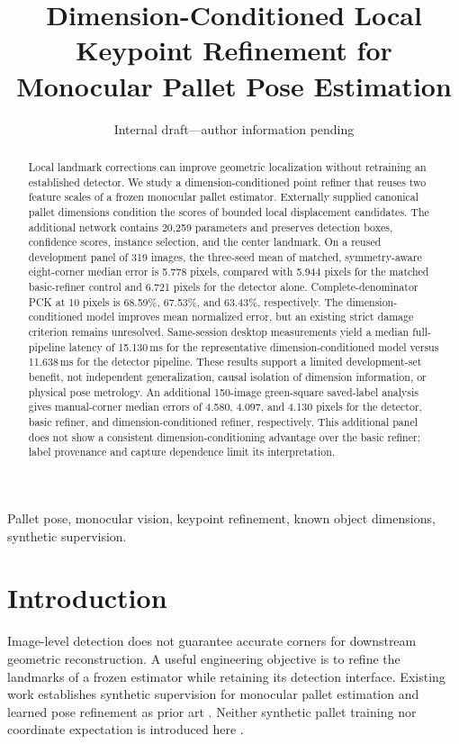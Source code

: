 \documentclass[journal]{IEEEtran}
\title{Dimension-Conditioned Local Keypoint Refinement for Monocular Pallet Pose Estimation}
\author{Internal draft---author information pending}
\begin{document}
\maketitle
\begin{abstract}
Local landmark corrections can improve geometric localization without retraining an established detector. We study a dimension-conditioned point refiner that reuses two feature scales of a frozen monocular pallet estimator. Externally supplied canonical pallet dimensions condition the scores of bounded local displacement candidates. The additional network contains 20,259 parameters and preserves detection boxes, confidence scores, instance selection, and the center landmark. On a reused development panel of 319 images, the three-seed mean of matched, symmetry-aware eight-corner median error is 5.778 pixels, compared with 5.944 pixels for the matched basic-refiner control and 6.721 pixels for the detector alone. Complete-denominator PCK at 10 pixels is 68.59\%, 67.53\%, and 63.43\%, respectively. The dimension-conditioned model improves mean normalized error, but an existing strict damage criterion remains unresolved. Same-session desktop measurements yield a median full-pipeline latency of 15.130\,ms for the representative dimension-conditioned model versus 11.638\,ms for the detector pipeline. These results support a limited development-set benefit, not independent generalization, causal isolation of dimension information, or physical pose metrology.
An additional 150-image green-square saved-label analysis gives manual-corner median errors of 4.580, 4.097, and 4.130 pixels for the detector, basic refiner, and dimension-conditioned refiner, respectively. This additional panel does not show a consistent dimension-conditioning advantage over the basic refiner; label provenance and capture dependence limit its interpretation.
\end{abstract}
\begin{IEEEkeywords}
Pallet pose, monocular vision, keypoint refinement, known object dimensions, synthetic supervision.
\end{IEEEkeywords}

\section{Introduction}
Image-level detection does not guarantee accurate corners for downstream geometric reconstruction. A useful engineering objective is to refine the landmarks of a frozen estimator while retaining its detection interface. Existing work establishes synthetic supervision for monocular pallet estimation and learned pose refinement as prior art \cite{knitt,posefix}. Neither synthetic pallet training nor coordinate expectation is introduced here \cite{integral}.
\end{document}
